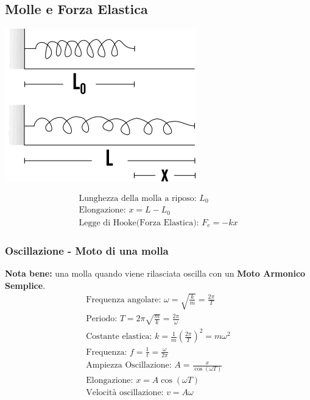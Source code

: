 \subsection{Molle e Forza Elastica}
\begin{center}
\includegraphics[width=0.4 \linewidth]{Dinamica/forza-elastica.png} 
\end{center}
\begin{gather*}
    \text{Lunghezza della molla a riposo: } L_0 \\
    \text{Elongazione: } x = L - L_0 \\
    \text{Legge di Hooke(Forza Elastica): } F_e = -k x 
\end{gather*}
\subsubsection{Oscillazione - Moto di una molla}
\textbf{Nota bene: } una molla quando viene rilasciata oscilla con un \textbf{Moto Armonico Semplice}.
\begin{gather*}
    \text{Frequenza angolare: } \omega = \sqrt{\frac{k}{m}} = \frac{2 \pi}{T} \\
    \text{Periodo: } T = 2 \pi \sqrt{\frac{m}{k}} = \frac{2 \pi}{\omega} \\
    \text{Costante elastica: } k = \frac{1}{m} (\frac{2 \pi}{T})^2 = m \omega^2 \\
    \text{Frequenza: } f = \frac{1}{t} = \frac{\omega}{2 \pi} \\
    \text{Ampiezza Oscillazione: } A = \frac{x}{\cos (\omega T)} \\
    \text{Elongazione: } x = A \cos (\omega T) \\
    \text{Velocità oscillazione: } v = A \omega
\end{gather*}